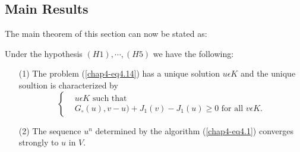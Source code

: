 \subsection{Main Results}\label{chap4-subsec4.3}
The main theorem of this section can now be stated as:

\begin{theorem}\label{chap4-thm4.1}
Under the hypothesis $(H1), \cdots , (H5)$ we have the following:
\begin{enumerate}
\item[(1)] The problem (\ref{chap4-eq4.14}) has a unique solution $u \epsilon K$ and the unique soultion is characterized by
\begin{equation*}
\begin{cases}
& u \epsilon K \text{ such that }\\
& G_{\circ}(u), v-u) + J_{1}(v) - J_{1}(u) \geq 0 \text{ for all } v \epsilon K.\tag{4.15}\label{chap4-eq4.15}
\end{cases}
\end{equation*}

\item[(2)] The sequence $u^{n}$ determined by the algorithm (\ref{chap4-eq4.1}) converges strongly to $u$ in $V$.
\end{enumerate}
\end{theorem}

